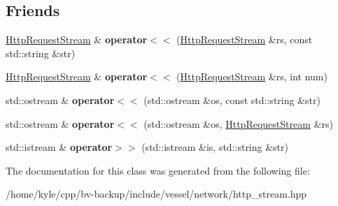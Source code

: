\subsection*{Friends}
\begin{DoxyCompactItemize}
\item 
\mbox{\label{class_vessel_1_1_networking_1_1_http_request_stream_a2d24d2c7425ac458c963bdc51059415c}} 
\hyperlink{class_vessel_1_1_networking_1_1_http_request_stream}{Http\+Request\+Stream} \& {\bfseries operator$<$$<$} (\hyperlink{class_vessel_1_1_networking_1_1_http_request_stream}{Http\+Request\+Stream} \&rs, const std\+::string \&str)
\item 
\mbox{\label{class_vessel_1_1_networking_1_1_http_request_stream_a7ff230dac2eb391d3a09f6338c5a7a73}} 
\hyperlink{class_vessel_1_1_networking_1_1_http_request_stream}{Http\+Request\+Stream} \& {\bfseries operator$<$$<$} (\hyperlink{class_vessel_1_1_networking_1_1_http_request_stream}{Http\+Request\+Stream} \&rs, int num)
\item 
\mbox{\label{class_vessel_1_1_networking_1_1_http_request_stream_aafc07abcec7431466712ee2a45f95b70}} 
std\+::ostream \& {\bfseries operator$<$$<$} (std\+::ostream \&os, const std\+::string \&str)
\item 
\mbox{\label{class_vessel_1_1_networking_1_1_http_request_stream_aa6b90dd91dd9c446c9238d631a3661a8}} 
std\+::ostream \& {\bfseries operator$<$$<$} (std\+::ostream \&os, \hyperlink{class_vessel_1_1_networking_1_1_http_request_stream}{Http\+Request\+Stream} \&rs)
\item 
\mbox{\label{class_vessel_1_1_networking_1_1_http_request_stream_af60ace94cdad2d7b5305db0fc6c92fd9}} 
std\+::istream \& {\bfseries operator$>$$>$} (std\+::istream \&is, std\+::string \&str)
\end{DoxyCompactItemize}


The documentation for this class was generated from the following file\+:\begin{DoxyCompactItemize}
\item 
/home/kyle/cpp/bv-\/backup/include/vessel/network/http\+\_\+stream.\+hpp\end{DoxyCompactItemize}
